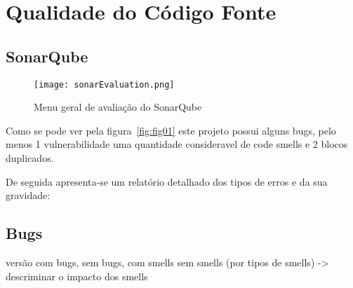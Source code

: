 \section{Qualidade do Código Fonte}

\subsection{SonarQube}

\begin{figure}[H]

  \centering

  \texttt{[image: sonarEvaluation.png]}

  \caption {Menu geral de avaliação do SonarQube}

  \label {fig01}

\end{figure}


\par Como se pode ver pela figura~\ref{fig:fig01} este projeto possui alguns bugs, pelo menos 1 vulnerabilidade uma quantidade consideravel de code smells e 2 blocos duplicados.


De seguida apresenta-se um relatório detalhado dos tipos de erros e da sua gravidade:
\subsection{Bugs}
versão com bugs, sem bugs, com smells sem smells (por tipos de smells) -> descriminar o impacto dos smells
